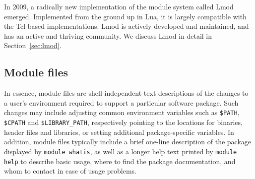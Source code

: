 In 2009, a radically new implementation of the module system called
Lmod~\cite{taccLmod} emerged. Implemented from the ground up in
Lua, it is largely compatible with the Tcl-based
implementations.  Lmod is actively developed and maintained, and has
an active and thriving community. We discuss Lmod in detail in
Section~\ref{sec:lmod}.


%
%

\subsection{Module files}
\label{sec:Module_files}

In essence, module files are shell-independent text descriptions of
the changes to a user's environment required to support a
particular software package. Such changes may include adjusting common environment variables such as \texttt{\small \$PATH},
\texttt{\small \$CPATH} and \texttt{\small \$LIBRARY\_PATH}, respectively pointing
to the locations for binaries, header files and libraries, or setting additional
package-specific variables. In addition,
module files typically include a brief one-line description of the
package displayed by \texttt{\small module whatis}, as well as a longer help
text printed by \texttt{\small module help} to describe basic usage,
where to find the package documentation, and whom to contact in case
of usage problems.


